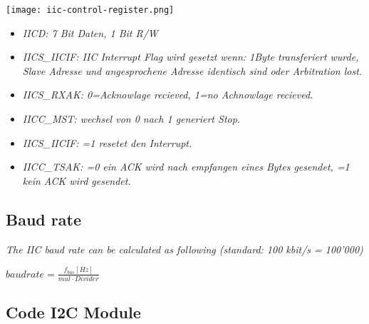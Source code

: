 \texttt{[image: iic-control-register.png]}

\begin{itemize}
    \item{
        \textit{
            IICD: 7 Bit Daten, 1 Bit R/W
        }
    }
    \item{
        \textit{
            IICS\_IICIF: IIC Interrupt Flag wird gesetzt wenn: 1Byte transferiert wurde,
            Slave Adresse und angesprochene Adresse identisch sind oder Arbitration lost.
        }
    }
    \item{
        \textit{
            IICS\_RXAK: 0=Acknowlage recieved, 1=no Achnowlage recieved.
        }
    }
    \item{
        \textit{
            IICC\_MST: wechsel von 0 nach 1 generiert Stop.
        }
    }
    \item{
        \textit{
            IICS\_IICIF: =1 resetet den Interrupt.
        }
    }
    \item{
        \textit{
            IICC\_TSAK: =0 ein ACK wird nach empfangen eines Bytes gesendet, =1 kein ACK
            wird gesendet.
        }
    }
\end{itemize}

\subsection{Baud rate}

\textit{
    The IIC baud rate can be calculated as following (standard: 100 kbit/s = 100'000)
}

$baudrate = \frac{f_{bus}[Hz]}{mul \cdot Divider}$

\subsection{Code I2C Module}

